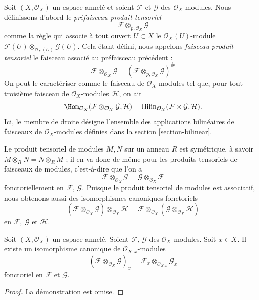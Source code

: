 \medskip\noindent
Soit $(X, \mathcal{O}_X)$ un espace annelé et soient
$\mathcal{F}$ et $\mathcal{G}$ des $\mathcal{O}_X$-modules.
Nous définissons d'abord le {\it préfaisceau produit tensoriel}
$$
\mathcal{F} \otimes_{p, \mathcal{O}_X} \mathcal{G}
$$
comme la règle qui associe à tout ouvert $U \subset X$ le
$\mathcal{O}_X(U)$-module
$\mathcal{F}(U) \otimes_{\mathcal{O}_X(U)} \mathcal{G}(U)$.
Cela étant défini, nous appelons {\it faisceau produit tensoriel}
le faisceau associé au préfaisceau précédent :
$$
\mathcal{F} \otimes_{\mathcal{O}_X} \mathcal{G}
=
(\mathcal{F} \otimes_{p, \mathcal{O}_X} \mathcal{G})^\#
$$
On peut le caractériser comme le faisceau de
$\mathcal{O}_X$-modules tel que, pour tout troisième
faisceau de $\mathcal{O}_X$-modules $\mathcal{H}$,
on ait
$$
\Hom_{\mathcal{O}_X}
(\mathcal{F} \otimes_{\mathcal{O}_X} \mathcal{G}, \mathcal{H})
=
\text{Bilin}_{\mathcal{O}_X}(\mathcal{F} \times \mathcal{G}, \mathcal{H}).
$$
Ici, le membre de droite désigne l'ensemble des applications bilinéaires de faisceaux
de $\mathcal{O}_X$-modules définies dans la section \ref{section-bilinear}.

\medskip\noindent
Le produit tensoriel de modules $M, N$ sur un anneau $R$ est symétrique,
à savoir $M \otimes_R N = N \otimes_R M$ ; il en va donc de même pour
les produits tensoriels de faisceaux de modules, c'est-à-dire que l'on a
$$
\mathcal{F} \otimes_{\mathcal{O}_X} \mathcal{G}
=
\mathcal{G} \otimes_{\mathcal{O}_X} \mathcal{F}
$$
fonctoriellement en $\mathcal{F}$, $\mathcal{G}$.
Puisque le produit tensoriel de modules est associatif, nous
obtenons aussi des isomorphismes canoniques fonctoriels
$$
(\mathcal{F} \otimes_{\mathcal{O}_X} \mathcal{G})
\otimes_{\mathcal{O}_X} \mathcal{H}
=
\mathcal{F} \otimes_{\mathcal{O}_X}
(\mathcal{G} \otimes_{\mathcal{O}_X} \mathcal{H})
$$
en $\mathcal{F}$, $\mathcal{G}$ et $\mathcal{H}$.

\begin{lemma}
\label{lemma-stalk-tensor-product}
Soit $(X, \mathcal{O}_X)$ un espace annelé.
Soient $\mathcal{F}$, $\mathcal{G}$ des $\mathcal{O}_X$-modules.
Soit $x \in X$. Il existe un isomorphisme canonique
de $\mathcal{O}_{X, x}$-modules
$$
(\mathcal{F} \otimes_{\mathcal{O}_X} \mathcal{G})_x
=
\mathcal{F}_x \otimes_{\mathcal{O}_{X, x}} \mathcal{G}_x
$$
fonctoriel en $\mathcal{F}$ et $\mathcal{G}$.
\end{lemma}

\begin{proof}
La démonstration est omise.
\end{proof}

